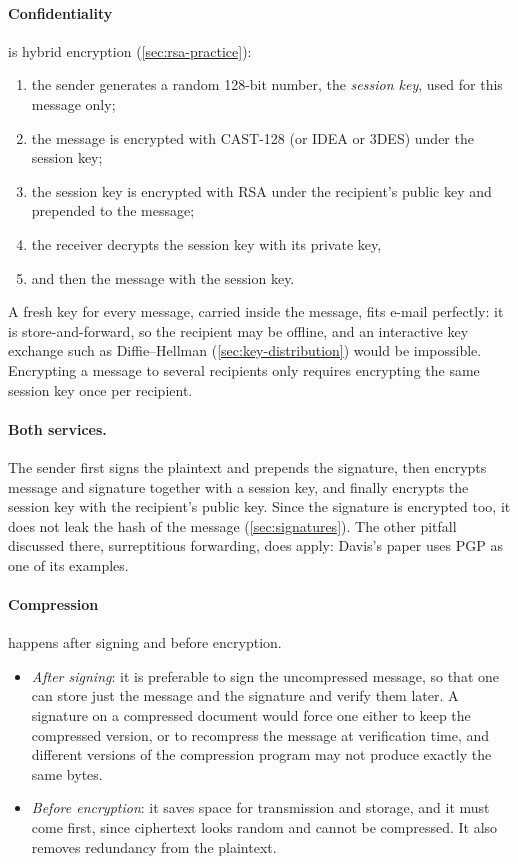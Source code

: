 \paragraph{Confidentiality} is hybrid encryption (\cref{sec:rsa-practice}):
\begin{enumerate}
    \item the sender generates a random 128-bit number, the \emph{session key}, used for this message only;
    \item the message is encrypted with CAST-128 (or IDEA or 3DES) under the session key;
    \item the session key is encrypted with RSA under the recipient's public key and prepended to the message;
    \item the receiver decrypts the session key with its private key,
    \item and then the message with the session key.
\end{enumerate}
A fresh key for every message, carried inside the message, fits e-mail perfectly: it is store-and-forward, so the recipient may be offline, and an interactive key exchange such as Diffie--Hellman (\cref{sec:key-distribution}) would be impossible. Encrypting a message to several recipients only requires encrypting the same session key once per recipient.

\paragraph{Both services.} The sender first signs the plaintext and prepends the signature, then encrypts message and signature together with a session key, and finally encrypts the session key with the recipient's public key. Since the signature is encrypted too, it does not leak the hash of the message (\cref{sec:signatures}). The other pitfall discussed there, surreptitious forwarding, does apply: Davis's paper \cite{davis2001} uses PGP as one of its examples.

\paragraph{Compression} happens after signing and before encryption.
\begin{itemize}
    \item \emph{After signing}: it is preferable to sign the uncompressed message, so that one can store just the message and the signature and verify them later. A signature on a compressed document would force one either to keep the compressed version, or to recompress the message at verification time, and different versions of the compression program may not produce exactly the same bytes.
    \item \emph{Before encryption}: it saves space for transmission and storage, and it must come first, since ciphertext looks random and cannot be compressed. It also removes redundancy from the plaintext.
\end{itemize}

